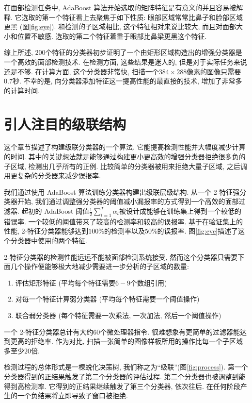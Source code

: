 \documentclass[a4paper,utf8,11pt, onecolumn]{ctexart}
\begin{document}
在面部检测任务中, AdaBoost 算法开始选取的矩阵特征是有意义的并且容易被解释. 它选取的第一个特征看上去聚焦于如下性质: 眼部区域常常比鼻子和脸部区域更黑 (图\ref{fig:eye}). 和检测的子区域相比, 这个特征相对来说比较大, 而且对面部大小和位置不敏感. 选取的第二个特征着重于眼部比鼻梁更黑这个特征.

综上所述, $200$个特征的分类器初步证明了一个由矩形区域构造出的增强分类器是一个高效的面部检测技术. 在检测方面, 这些结果是迷人的, 但是对于实际任务来说还是不够. 在计算方面, 这个分类器非常快, 扫描一个$384\times288$像素的图像只需要$0.7$秒. 不幸的是, 向分类器添加特征这一提高性能的最直接的技术, 增加了非常多的计算时间.

\section{引人注目的级联结构}\label{sec:cascade}
这个章节描述了构建级联分类器的一个算法. 它能提高检测性能并大幅度减少计算的时间. 其中的关键想法就是能够通过构建更小更高效的增强分类器拒绝很多负的子区域, 检测出几乎所有的正例. 比较简单的分类器被用来拒绝大量子区域, 之后调用更复杂的分类器来减少误报率.

我们通过使用 AdaBoost 算法训练分类器构建出级联层级结构. 从一个 2-特征强分类器开始, 我们通过调整强分类器的阈值减小漏报率的方式得到一个高效的面部过滤器. 起初的 AdaBoost 阈值$\frac12\sum_{t=1}^T\alpha_t$被设计成能够在训练集上得到一个较低的错误率. 一个较低的阈值带来了较高的检测率和较高的误报率. 基于在验证集上的性能, 2-特征分类器能够达到$100\%$的检测率以及$50\%$的误报率. 图\ref{fig:eye}描述了这个分类器中使用的两个特征.

2-特征分类器的检测性能远远不能被面部检测系统接受, 然而这个分类器只需要下面几个操作便能够极大地减少需要进一步分析的子区域的数量:
\begin{enumerate}
\item 评估矩形特征 (平均每个特征需要$6-9$个数组引用)
\item 对每一个特征计算弱分类器 (平均每个特征需要一个阈值操作)
\item 联合弱分类器 (每个特征需要一次乘法, 一次加法, 然后一个阈值操作)
\end{enumerate}

一个 2-特征分类器总计有大约$60$个微处理器指令. 很难想象有更简单的过滤器能达到更高的拒绝率. 作为对比, 扫描一张简单的图像样板所用的操作比每一个子区域多至少$20$倍.

检测过程的总体形式是一棵蜕化决策树, 我们称之为``级联''\citep{quinlan1986induction}(图\ref{fig:process}). 第一个分类器得到的正结果触发了第二个分类器的评估过程. 第二个分类器也被调整到能得到高检测率. 它得到的正结果继续触发了第三个分类器, 依次往后. 在任何阶段产生的一个负结果将立即导致子窗口被拒绝.
\end{document}
